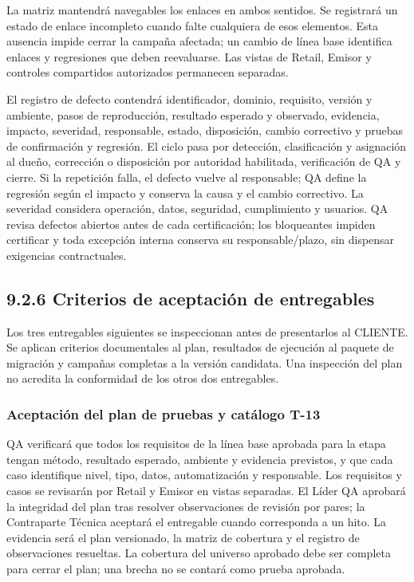 \documentclass[11pt]{article}
\begin{document}
La matriz mantendrá navegables los enlaces en ambos sentidos. Se registrará un estado de enlace incompleto cuando falte cualquiera de esos elementos. Esta ausencia impide cerrar la campaña afectada; un cambio de línea base identifica enlaces y regresiones que deben reevaluarse. Las vistas de Retail, Emisor y controles compartidos autorizados permanecen separadas.

El registro de defecto contendrá identificador, dominio, requisito, versión y ambiente, pasos de reproducción, resultado esperado y observado, evidencia, impacto, severidad, responsable, estado, disposición, cambio correctivo y pruebas de confirmación y regresión. El ciclo pasa por detección, clasificación y asignación al dueño, corrección o disposición por autoridad habilitada, verificación de QA y cierre. Si la repetición falla, el defecto vuelve al responsable; QA define la regresión según el impacto y conserva la causa y el cambio correctivo. La severidad considera operación, datos, seguridad, cumplimiento y usuarios. QA revisa defectos abiertos antes de cada certificación; los bloqueantes impiden certificar y toda excepción interna conserva su responsable/plazo, sin dispensar exigencias contractuales.

\subsection{9.2.6 Criterios de aceptación de entregables}

Los tres entregables siguientes se inspeccionan antes de presentarlos al CLIENTE. Se aplican criterios documentales al plan, resultados de ejecución al paquete de migración y campañas completas a la versión candidata. Una inspección del plan no acredita la conformidad de los otros dos entregables.

\subsubsection{Aceptación del plan de pruebas y catálogo T-13}

QA verificará que todos los requisitos de la línea base aprobada para la etapa tengan método, resultado esperado, ambiente y evidencia previstos, y que cada caso identifique nivel, tipo, datos, automatización y responsable. Los requisitos y casos se revisarán por Retail y Emisor en vistas separadas. El Líder QA aprobará la integridad del plan tras resolver observaciones de revisión por pares; la Contraparte Técnica aceptará el entregable cuando corresponda a un hito. La evidencia será el plan versionado, la matriz de cobertura y el registro de observaciones resueltas. La cobertura del universo aprobado debe ser completa para cerrar el plan; una brecha no se contará como prueba aprobada.
\end{document}
